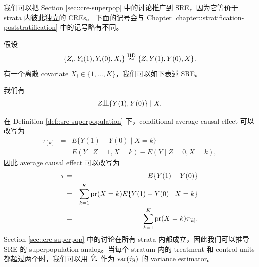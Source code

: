 我们可以把 Section \ref{sec::cre-superpop} 中的讨论推广到 SRE，因为它等价于 strata 内彼此独立的 CREs。 
下面的记号会与 Chapter \ref{chapter::stratification-poststratification} 中的记号略有不同。 


假设 
$$
\{ Z_i,  Y_i(1), Y_i(0) ,  X_i  \}  \stackrel{\textup{IID}}{\sim} \{ Z,  Y(1), Y(0), X  \} .
$$ 
有一个离散 covariate $ X_i \in \{ 1,\ldots, K\}$，我们可以如下表述 SRE。


\begin{definition}
\label{def::sre-superpopulation}
我们有 
$$
Z\ind\{  Y(1), Y(0) \} \mid   X  .
$$
\end{definition}


在 Definition \ref{def::sre-superpopulation} 下，conditional average causal effect 可以改写为
\begin{eqnarray*}
\tau_{[k]}  &=&  E\{   Y(1) -  Y(0)  \mid X= k \} \\
&=& E(Y\mid Z=1, X=k) - E(Y\mid Z=0, X=k),
\end{eqnarray*}
因此 average causal effect 可以改写为
\begin{eqnarray*}
\tau &=&   E\{   Y(1) -  Y(0)   \}  \\
&=& \sum_{k=1}^K \textup{pr}(X = k) E\{   Y(1) -  Y(0)  \mid X = k \} \\
&=& \sum_{k=1}^K \textup{pr}(X  = k) \tau_{[k]} .
\end{eqnarray*}
%
Section \ref{sec::cre-superpop} 中的讨论在所有 strata 内都成立，因此我们可以推导 SRE 的 superpopulation analog。当每个 stratum 内的 treatment 和 control units 都超过两个时，我们可以用 $\hat{V}_\textsc{S}$ 作为 $\textup{var}( \hat{\tau}_\textsc{S} )$ 的 variance estimator。 


